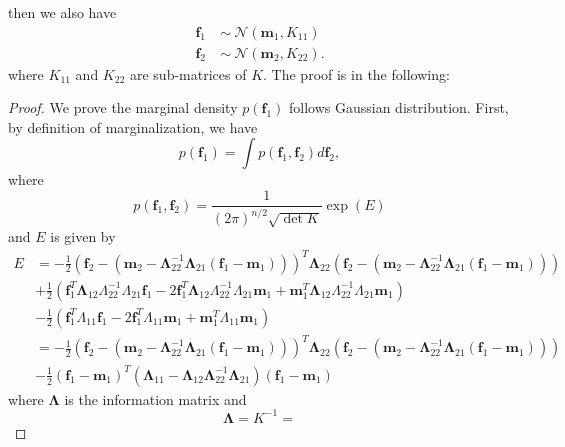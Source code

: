 \documentclass[11pt,a4paper]{article}
\theoremstyle{definition}
\numberwithin{equation}{section}
\let\vec\mathbf
\begin{document}
	then we also have 
	\begin{equation*} \label{}
	\begin{split}
	\vec f_1\ & \sim \ \mathcal N \left(\vec m_1 , K_{11} \right)\\
	\vec f_2\ & \sim \ \mathcal N \left(\vec m_2 , K_{22} \right).
	\end{split}
	\end{equation*}
	where $K_{11}$ and  $K_{22}$ are sub-matrices of $K$. The proof is in the following:
	\begin{proof}
		We prove the marginal density $p(\vec f_1)$ follows Gaussian distribution. First, by definition of marginalization, we have
		\begin{equation*} \label{}
		p(\vec f_1) = \int p(\vec f_1,\vec f_2)d \vec f_2,
		\end{equation*}
		where 
		\begin{equation*} \label{}
		p(\vec f_1,\vec f_2) = \frac{1}{(2\pi)^{n/2}\sqrt{\det K}}\exp{(E)}
		\end{equation*}
		and $E$ is given by
		\begin{equation*} \label{}
		\begin{split}
		E &= -\frac{1}{2}\left(\vec f_2-(\vec m_2 - \vec\Lambda_{22}^{-1} \vec\Lambda_{21}(\vec f_1 - \vec m_1))\right)^T\vec\Lambda_{22}\left(\vec f_2-(\vec m_2 - \vec\Lambda_{22}^{-1} \vec\Lambda_{21}(\vec f_1 - \vec m_1))\right)\\
		&+\frac{1}{2}\left(\vec f_1^T \vec\Lambda_{12}\Lambda_{22}^{-1}\Lambda_{21}\vec f_1 - 2\vec f_1^T \vec\Lambda_{12}\Lambda_{22}^{-1}\Lambda_{21}\vec m_1 + \vec m_1^T \vec\Lambda_{12}\Lambda_{22}^{-1}\Lambda_{21}\vec m_1\right)\\
		&-\frac{1}{2}\left(\vec f_1^T\Lambda_{11}\vec f_1 - 2\vec f_1^T\Lambda_{11}\vec m_1 + \vec m_1^T\Lambda_{11}\vec m_1\right)\\
		&=-\frac{1}{2}\left(\vec f_2-(\vec m_2 - \vec\Lambda_{22}^{-1} \vec\Lambda_{21}(\vec f_1 - \vec m_1))\right)^T\vec\Lambda_{22}\left(\vec f_2-(\vec m_2 - \vec\Lambda_{22}^{-1} \vec\Lambda_{21}(\vec f_1 - \vec m_1))\right)\\
		&-\frac{1}{2}\left(\vec f_1 - \vec m_1\right)^T\left(\vec\Lambda_{11}-\vec\Lambda_{12}\vec\Lambda_{22}^{-1}\vec\Lambda_{21}\right)\left(\vec f_1 - \vec m _1 \right)
		\end{split}
		\end{equation*}
		where $\vec\Lambda$ is the information matrix and
		\begin{equation*} \label{}
		\vec \Lambda = K^{-1} = 

\end{equation*}
\end{proof}
\end{document}
